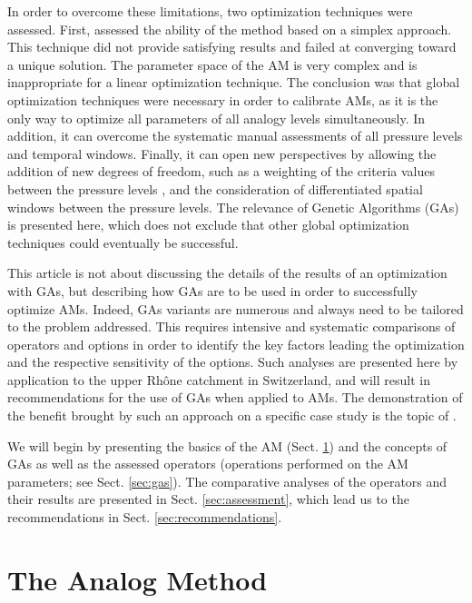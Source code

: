 \documentclass{ametsoc}
\begin{document}
In order to overcome these limitations, two optimization techniques were assessed. First, \citet{Horton2012a} assessed the ability of the \citet{Nelder1965a} method based on a simplex approach. This technique did not provide satisfying results and failed at converging toward a unique solution. The parameter space of the AM is very complex and is inappropriate for a linear optimization technique. The conclusion was that global optimization techniques were necessary in order to calibrate AMs, as it is the only way to optimize all parameters of all analogy levels simultaneously. In addition, it can overcome the systematic manual assessments of all pressure levels and temporal windows. Finally, it can open new perspectives by allowing the addition of new degrees of freedom, such as a weighting of the criteria values between the pressure levels \citep[see][]{Horton2016b}, and the consideration of differentiated spatial windows between the pressure levels. The relevance of Genetic Algorithms (GAs) is presented here, which does not exclude that other global optimization techniques could eventually be successful. 

This article is not about discussing the details of the results of an optimization with GAs, but describing how GAs are to be used in order to successfully optimize AMs. Indeed, GAs variants are numerous and always need to be tailored to the problem addressed. This requires intensive and systematic comparisons of operators and options in order to identify the key factors leading the optimization and the respective sensitivity of the options. Such analyses are presented here by application to the upper Rh\^{o}ne catchment in Switzerland, and will result in recommendations for the use of GAs when applied to AMs. The demonstration of the benefit brought by such an approach on a specific case study is the topic of \citet{Horton2016b}. 

We will begin by presenting the basics of the AM (Sect. \ref{sec:am}) and the concepts of GAs as well as the assessed operators (operations performed on the AM parameters; see Sect. \ref{sec:gas}). The comparative analyses of the operators and their results are presented in Sect. \ref{sec:assessment}, which lead us to the recommendations in Sect. \ref{sec:recommendations}.


\section{The Analog Method}
\label{sec:am}
\end{document}
